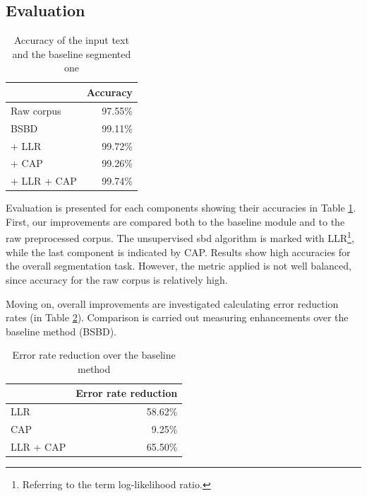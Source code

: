 \subsection{Evaluation}


\begin{table}[H]
\centering
\caption{Accuracy of the input text and the baseline segmented one}
\label{tab:base}
\begin{tabular}{ l  r } 
\hline
& Accuracy \\ 
\hline
Raw corpus  & 97.55\% \\
BSBD & 99.11\% \\
+ LLR & 99.72\% \\
+ CAP & 99.26\% \\
+ LLR + CAP & 99.74\% \\
\hline
\end{tabular}
\end{table}

Evaluation is presented for each components showing their accuracies in Table \ref{tab:base}.
First, our improvements are compared both to the baseline module and to the raw preprocessed corpus.
The unsupervised \acrshort{sbd} algorithm is marked with LLR\footnote{Referring to the term log-likelihood ratio.}, while the last component is indicated by CAP.
Results show high accuracies for the overall segmentation task.
However, the metric applied is not well balanced, since accuracy for the raw corpus is relatively high.

Moving on, overall improvements are investigated calculating error reduction rates (in Table \ref{tab:reduction}). 
Comparison is carried out measuring enhancements over the baseline method (BSBD). 

\begin{table}[H]
\centering
\caption{Error rate reduction over the baseline method}
\label{tab:reduction}
\begin{tabular}{ l  r } 
\hline
& Error rate reduction\\
\hline
LLR & 58.62\% \\
CAP & 9.25\% \\
LLR + CAP & 65.50\% \\
\hline
\end{tabular}
\end{table}

